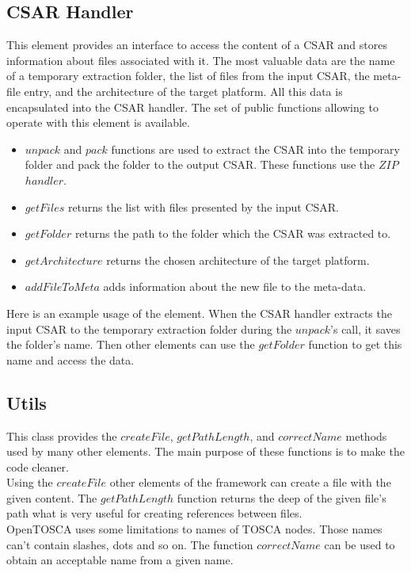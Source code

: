 \subsection*{CSAR Handler}
This element provides an interface to access the content of a CSAR and stores information about files associated with it.
The most valuable data are the name of a temporary extraction folder, the list of files from the input CSAR, the meta-file entry, and the architecture of the target platform.
All this data is encapsulated into the CSAR handler.
The set of public functions allowing to operate with this element is available.
\begin{itemize}
	\item $unpack$ and $pack$ functions are used to extract the CSAR into the temporary folder and pack the folder to the output CSAR. 
	These functions use the $ZIP$~$handler$.
	\item $getFiles$ returns the list with files presented by the input CSAR.
	\item $getFolder$ returns the path to the folder which the CSAR was extracted to.
	\item $getArchitecture$ returns the chosen architecture of the target platform.
	\item $addFileToMeta$ adds information about the new file to the meta-data.
\end{itemize}
Here is an example usage of the element.
When the CSAR handler extracts the input CSAR to the temporary extraction folder during the $unpack$'s call, it saves the folder's name. 
Then other elements can use the $getFolder$ function to get this name and access the data.

\subsection*{Utils}
This class provides the $createFile$, $getPathLength$, and $correctName$ methods used by many other elements.
The main purpose of these functions is to make the code cleaner. \\
Using the $createFile$ other elements of the framework can create a file with the given content.
The $getPathLength$ function returns the deep of the given file's path what is very useful for creating references between files.\\
OpenTOSCA uses some limitations to names of TOSCA nodes. 
Those names can't contain slashes, dots and so on.
The function $correctName$ can be used to obtain an acceptable name from a given name.

